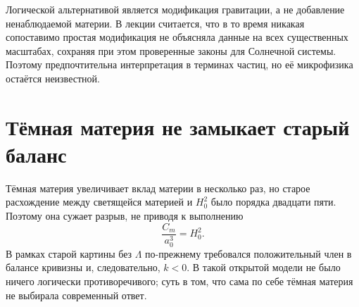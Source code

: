 \begin{classroomqa}
\end{classroomqa}

\begin{classroomqa}
\end{classroomqa}

Логической альтернативой является модификация гравитации, а не добавление ненаблюдаемой материи. В лекции считается, что в то время никакая сопоставимо простая модификация не объясняла данные на всех существенных масштабах, сохраняя при этом проверенные законы для Солнечной системы. Поэтому предпочтительна интерпретация в терминах частиц, но её микрофизика остаётся неизвестной.

\section{Тёмная материя не замыкает старый баланс}

Тёмная материя увеличивает вклад материи в несколько раз, но старое расхождение между светящейся материей и \(H_0^2\) было порядка двадцати пяти. Поэтому она сужает разрыв, не приводя к выполнению
\begin{equation}
\frac{C_m}{a_0^3}=H_0^2.
\end{equation}
В рамках старой картины без \(\Lambda\) по-прежнему требовался положительный член в балансе кривизны и, следовательно, \(k<0\). В такой открытой модели не было ничего логически противоречивого; суть в том, что сама по себе тёмная материя не выбирала современный ответ.


